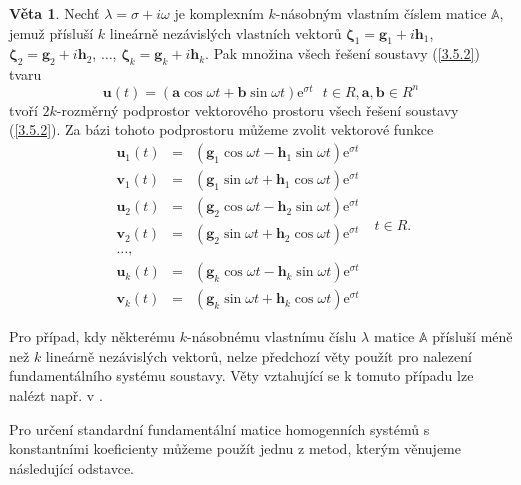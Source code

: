 \documentclass[a4paper, 12pt]{book}
\theoremstyle{definition}
\newtheorem{theorem}{Věta}[section]
\def\vc#1{\mathbf{\boldsymbol{#1}}}     %
\def\tn#1{{\mathbb{#1}}}    %
\begin{document}
\begin{theorem}
Nechť $\lambda=\sigma + i\omega$ je komplexním $k$-násobným vlastním číslem 
matice $\tn A$, jemuž přísluší $k$ lineárně nezávislých vlastních vektorů 
$\vc\zeta_1=\vc g_1+i \vc h_1$, $\vc\zeta_2=\vc g_2+i \vc h_2$, $\dots$,
$\vc\zeta_k=\vc g_k+i \vc h_k$. Pak množina všech řešení soustavy 
(\ref{3.5.2}) tvaru
\begin{equation}
\vc u(t)=(\vc a\cos\omega t + \vc b\sin\omega t)\mathrm{e}^{\sigma t}~~~t\in R, \vc a, \vc b\in R^n
\end{equation}
tvoří $2k$-rozměrný podprostor vektorového prostoru všech řešení soustavy 
(\ref{3.5.2}). Za bázi tohoto podprostoru můžeme zvolit vektorové funkce 
\begin{equation}
\begin{array}{rcl}
\vc u_1(t)&=&(\vc g_1\cos\omega t - \vc h_1\sin\omega t)\mathrm{e}^{\sigma t}\\
\vc v_1(t)&=&(\vc g_1\sin\omega t + \vc h_1\cos\omega t)\mathrm{e}^{\sigma t}\\
\vc u_2(t)&=&(\vc g_2\cos\omega t - \vc h_2\sin\omega t)\mathrm{e}^{\sigma t}\\
\vc v_2(t)&=&(\vc g_2\sin\omega t + \vc h_2\cos\omega t)\mathrm{e}^{\sigma t}\\
\dots,\\
\vc u_k(t)&=&(\vc g_k\cos\omega t - \vc h_k\sin\omega t)\mathrm{e}^{\sigma t}\\
\vc v_k(t)&=&(\vc g_k\sin\omega t + \vc h_k\cos\omega t)\mathrm{e}^{\sigma t}
\end{array}
~~~t\in R.
\end{equation}
\end{theorem}

Pro případ, kdy některému $k$-násobnému vlastnímu číslu $\lambda$ matice $\tn A$ 
přísluší méně než $k$ lineárně nezávislých vektorů, nelze předchozí věty použít 
pro nalezení fundamentálního systému soustavy. Věty vztahující se k tomuto 
případu lze nalézt např. v \cite{Nagy}.

Pro určení standardní fundamentální matice homogenních systémů s konstantními 
koeficienty můžeme použít jednu z metod, kterým věnujeme následující odstavce.
\end{document}
